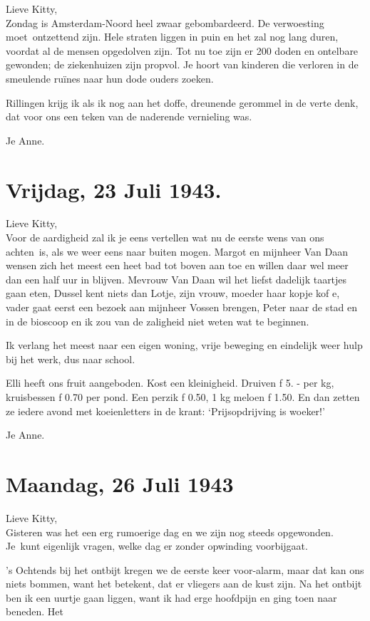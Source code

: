 \documentclass{book}
\begin{document}
Lieve Kitty,\\Zondag is Amsterdam-Noord heel zwaar gebombardeerd. De
verwoesting moet~ontzettend zijn. Hele straten liggen in puin en het zal
nog lang duren, voordat al de mensen opgedolven zijn. Tot nu toe zijn er
200 doden en ontelbare gewonden; de ziekenhuizen zijn propvol. Je hoort
van kinderen die verloren in de smeulende ruïnes naar hun dode ouders
zoeken.

Rillingen krijg ik als ik nog aan het doffe, dreunende gerommel in de
verte denk, dat voor ons een teken van de naderende vernieling was.

Je Anne.

\chapter{Vrijdag, 23 Juli 1943.}

Lieve Kitty,\\Voor de aardigheid zal ik je eens vertellen wat nu de
eerste wens van ons achten~is, als we weer eens naar buiten mogen.
Margot en mijnheer Van Daan wensen zich het meest een heet bad tot boven
aan toe en willen daar wel meer dan een half uur in blijven. Mevrouw Van
Daan wil het liefst dadelijk taartjes gaan eten, Dussel kent niets dan
Lotje, zijn vrouw, moeder haar kopje kof e, vader gaat eerst een bezoek
aan mijnheer Vossen brengen, Peter naar de stad en in de bioscoop en ik
zou van de zaligheid niet weten wat te beginnen.

Ik verlang het meest naar een eigen woning, vrije beweging en eindelijk
weer hulp bij het werk, dus naar school.

Elli heeft ons fruit aangeboden. Kost een kleinigheid. Druiven ƒ 5. -
per kg, kruisbessen ƒ 0.70 per pond. Een perzik ƒ 0.50, 1 kg meloen ƒ
1.50. En dan zetten ze iedere avond met koeienletters in de krant:
`Prijsopdrijving is woeker!'

Je Anne.

\chapter{Maandag, 26 Juli 1943}

Lieve Kitty,\\Gisteren was het een erg rumoerige dag en we zijn nog
steeds opgewonden. Je~kunt eigenlijk vragen, welke dag er zonder
opwinding voorbijgaat.

's Ochtends bij het ontbijt kregen we de eerste keer voor-alarm, maar
dat kan ons niets bommen, want het betekent, dat er vliegers aan de kust
zijn. Na het ontbijt ben ik een uurtje gaan liggen, want ik had erge
hoofdpijn en ging toen naar beneden. Het
\end{document}
